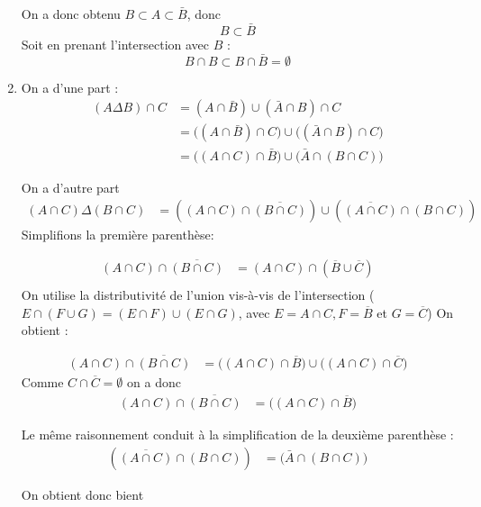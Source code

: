 \documentclass[a4paper, 11pt,reqno]{article}
\begin{document}
\begin{correction}
\begin{enumerate}
On a donc obtenu $B\subset A\subset \bar{B}$, donc 
$$B\subset \bar{B}$$
Soit en prenant l'intersection avec $B$ : 
$$B\cap B\subset B\cap \bar{B} =\emptyset$$


\item 
On a d'une part :
\begin{align*}
(A\Delta B)\cap C &= (A\cap \bar{B})\cup \left(\bar{A}\cap B\right) \cap C \\
							&= \Big((A\cap \bar{B})\cap C\Big)  \cup \Big( \left(\bar{A}\cap B\right) \cap C \Big) \\
							&=  \Big((A\cap C)\cap  \bar{B}\Big)  \cup \Big( \bar{A}\cap (B \cap C) \Big) 
\end{align*}

On a d'autre part 
\begin{align*}
(A\cap C)\Delta (B\cap C) &=  ((A\cap C)\cap \overline{ (B\cap C)})\cup \left(\overline{(A\cap C)}\cap  (B\cap C)\right) 
\end{align*}
Simplifions la première parenthèse: 

\begin{align*}
(A\cap C)\cap \overline{ (B\cap C)} &= (A\cap C)\cap \left(\overline{ B}\cup \overline{C}\right)\\
\end{align*}
On utilise la distributivité de l'union vis-à-vis de l'intersection 
($E\cap (F\cup G) = (E\cap F)\cup   (E\cap G)$, avec $E=A\cap C,  F=\overline{ B}$ et $G=\overline{ C}$)
On obtient : 

\begin{align*}
(A\cap C)\cap \overline{ (B\cap C)} &= \Big((A\cap C)\cap \overline{ B}\Big)\cup \Big((A\cap C) \cap \overline{C}\Big) 
\end{align*}
Comme $C\cap \overline{C} = \emptyset $ on a donc 
\begin{align*}
(A\cap C)\cap \overline{ (B\cap C)} &= \Big((A\cap C)\cap \overline{ B}\Big)
\end{align*}

Le même raisonnement conduit à la simplification de la deuxième parenthèse : 
\begin{align*}
\left(\overline{(A\cap C)}\cap  (B\cap C)\right)  &=  \Big( \bar{A}\cap (B \cap C) \Big) 
\end{align*}

On obtient donc bient 


\end{enumerate}
\end{correction}
\end{document}
